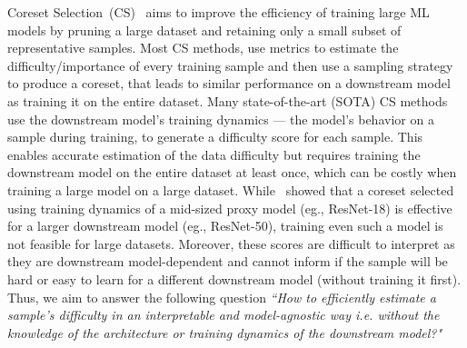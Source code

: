 Coreset Selection~(CS)~\cite{mirzasoleiman2020coresets, guo2022deepcore,paul2021deep,xia2022moderate,maharana2023d2,zheng2022coverage,choi2024bws} aims to improve the efficiency of training large ML models by pruning a large dataset and retaining only a small subset of representative samples.
Most CS methods, use metrics to estimate the difficulty/importance of every training sample and then use a sampling strategy to produce a coreset, that leads to similar performance on a downstream model as training it on the entire dataset. 
Many state-of-the-art (SOTA) CS methods use the downstream model's training dynamics --- the
model's behavior on a sample during training, to generate a difficulty score for each sample. 
This enables accurate estimation of the data difficulty but requires training the downstream model on the entire dataset at least once, which can be costly when training a large model on a large dataset.
While~\cite{coleman2019selection} showed that a coreset selected using training dynamics of a mid-sized proxy model (eg., ResNet-18) is effective for a larger downstream model (eg., ResNet-50), training even such a model is not feasible for large datasets. 
Moreover, these scores are difficult to interpret as they are downstream model-dependent and cannot inform if the sample will be hard or easy to learn for a different downstream model (without training it first).
Thus, we aim to answer the following question
\emph{``How to efficiently estimate a sample's difficulty in an interpretable and model-agnostic way i.e. without the knowledge of the architecture or training dynamics of the downstream model?"}

